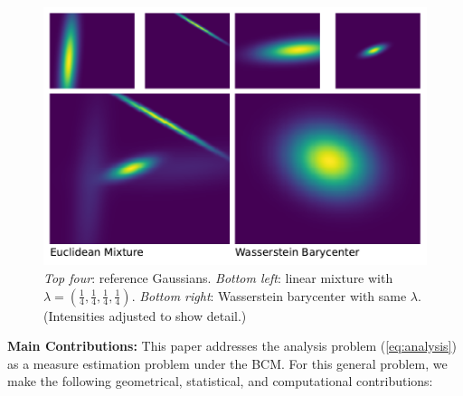 \documentclass[nohyperref]{article}
\theoremstyle{definition}
\begin{document}
\begin{figure}[t!]
    \centering
    \includegraphics[width=\linewidth]{figures/bc_vs_lin.pdf}
    \caption{\emph{Top four}: reference Gaussians. \emph{Bottom left}: linear mixture with $\lambda=(\frac{1}{4},\frac{1}{4},\frac{1}{4},\frac{1}{4} )$. \emph{Bottom right}: Wasserstein barycenter with same $\lambda$. (Intensities adjusted to show detail.)}
    \label{fig:bc_vs_lin}
\end{figure}

\vspace{10pt}
\textbf{Main Contributions:} This paper addresses the analysis problem (\ref{eq:analysis}) as a measure estimation problem under the BCM. For this general problem, we make the following geometrical, statistical, and computational contributions:
\end{document}
